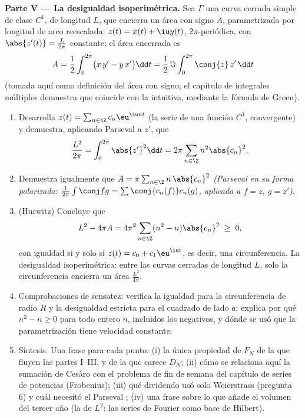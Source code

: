 \begin{problem}
\medskip
\noindent\textbf{Parte V --- La desigualdad isoperimétrica.} Sea
$\Gamma$ una curva cerrada simple de clase $C^1$, de longitud $L$,
que encierra un área con signo $A$, parametrizada por longitud de
arco reescalada: $z(t) = x(t) + \iu y(t)$, $2\pi$-periódica, con
$\abs{z'(t)} = \frac{L}{2\pi}$ constante; el área encerrada es
\[
A = \frac12\int_0^{2\pi}\bigl(x\,y' - y\,x'\bigr)\dd t
= \frac{1}{2}\,\Im\int_0^{2\pi}\conj{z}\,z'\,\dd t
\]
(tomada aquí como definición del área con signo; el capítulo de
integrales múltiples demuestra que coincide con la intuitiva,
mediante la fórmula de Green).
\begin{enumerate}[resume]
  \item Desarrolla $z(t) = \sum_{n\in\Z}c_n\eu^{\iu nt}$ (la serie de
        una función $C^1$,  convergente) y demuestra,
        aplicando Parseval a $z'$, que
        \[
        \frac{L^2}{2\pi} = \int_0^{2\pi}\abs{z'}^2\dd t
        = 2\pi\sum_{n\in\Z}n^2\abs{c_n}^2 .
        \]
  \item Demuestra igualmente que $A = \pi\sum_{n\in\Z}
        n\,\abs{c_n}^2$ \emph{(Parseval en su forma polarizada:
        $\frac{1}{2\pi}\int\conj f g = \sum \conj{c_n(f)}c_n(g)$,
        aplicada a $f = z$, $g = z'$)}.
  \item (Hurwitz) Concluye que
        \[
        L^2 - 4\pi A = 4\pi^2\sum_{n\in\Z}
        (n^2 - n)\abs{c_n}^2 \;\geq\; 0 ,
        \]
        con igualdad si y solo si $z(t) = c_0 + c_1\eu^{\iu t}$, es
        decir, una circunferencia. La desigualdad isoperimétrica:
        entre las curvas cerradas de longitud $L$, solo la
        circunferencia encierra un área $\frac{L^2}{4\pi}$.
  \item Comprobaciones de sensatez: verifica la igualdad para la
        circunferencia de radio $R$ y la desigualdad estricta para
        el cuadrado de lado $a$; explica por qué $n^2 - n \geq 0$
        para todo entero $n$, incluidos los negativos, y dónde se
        usó que la parametrización tiene velocidad constante.
  \item Síntesis. Una frase para cada punto: (i) la única propiedad
        de $F_N$ de la que fluyen las partes I--III, y de la que
        carece $D_N$; (ii) cómo se relaciona aquí la sumación de
        Cesàro con el problema de fin de semana del capítulo de
        series de potencias (Frobenius); (iii) qué dividendo usó
        solo Weierstrass (pregunta 6) y cuál necesitó el Parseval
        ; (iv) una frase sobre lo que añade el volumen del
        tercer año (la  de $L^2$: las series de Fourier
        como base de Hilbert).
\end{enumerate}
\end{problem}

